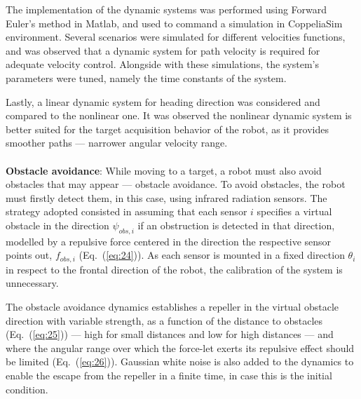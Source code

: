 The implementation of the
dynamic systems was performed using Forward Euler's method in Matlab, and used
to command a simulation in CoppeliaSim environment. Several scenarios were
simulated for different velocities functions, and was observed that a dynamic
system for path velocity is required for adequate velocity control. Alongside
with these simulations, the system's parameters were tuned, namely the time
constants of the system. 

Lastly, a linear dynamic system for heading direction
was considered and compared to the nonlinear one. 
It was observed the nonlinear
dynamic system is better suited for the target acquisition behavior of the
robot, as it provides smoother paths --- narrower angular velocity range.
\\\\
\textbf{Obstacle avoidance}: While moving to a target, a robot must also avoid obstacles that may appear ---
obstacle avoidance. To avoid obstacles, the robot must firstly detect them, in
this case, using infrared radiation sensors. The strategy adopted consisted in
assuming that each sensor $i$ specifies a virtual obstacle in the direction
$\psi_{obs,i}$ if an obstruction is detected in that direction, modelled by a
repulsive force centered in the direction the respective sensor points out,
$f_{obs,i}$ (Eq.~(\ref{eq:24})). As each sensor is mounted in a fixed direction
$\theta_i$ in respect to the frontal direction of the robot, the calibration of
the system is unnecessary. 

The obstacle avoidance dynamics establishes a
repeller in the virtual obstacle direction with variable strength, as a function
of the distance to obstacles (Eq.~(\ref{eq:25})) --- high for small distances
and low for high distances --- and where the angular range over which the
force-let exerts its repulsive effect should be limited
(Eq.~(\ref{eq:26})). Gaussian white noise is also added to the dynamics to
enable the escape from the repeller in a finite time, in case this is the
initial condition. 

